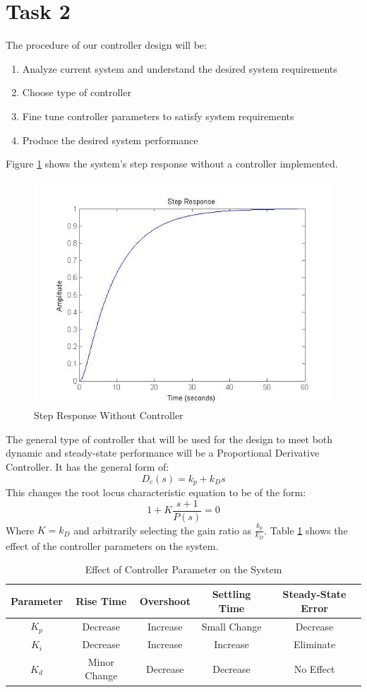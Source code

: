 \documentclass[12pt,letter]{article}
\begin{document}
\section*{Task 2}
The procedure of our controller design will be:
\begin{enumerate}
	\item Analyze current system and understand the desired system requirements
	\item Choose type of controller
	\item Fine tune controller parameters to satisfy system requirements
	\item Produce the desired system performance
\end{enumerate}
Figure \ref{fig:nocontrol} shows the system's step response without a controller implemented.
\begin{figure}[H]
\centering
\includegraphics[width=1\linewidth]{nocontrol}
\caption{Step Response Without Controller}
\label{fig:nocontrol}
\end{figure}
\noindent The general type of controller that will be used for the design to meet both dynamic and steady-state performance will be a Proportional Derivative Controller. It has the general form of:
$$D_{c}(s)=k_{p}+k_{D}s$$
This changes the root locus characteristic equation to be of the form:
$$1+K\frac{s+1}{P(s)}=0$$
Where $K=k_{D}$ and arbitrarily selecting the gain ratio as $\frac{k_{p}}{k_{D}}$. Table \ref{tab:param} shows the effect of the controller parameters on the system.
\begin{table}[H]
	\begin{tabular}{|c|c|c|c|c|}
		\hline
		\textbf{Parameter} & \textbf{Rise Time} & \textbf{Overshoot} & \textbf{Settling Time} & \textbf{Steady-State Error} \\ \hline
		$K_p$ & Decrease & Increase & Small Change & Decrease \\ \hline
		$K_i$ & Decrease & Increase & Increase & Eliminate \\ \hline
		$K_d$ & Minor Change & Decrease & Decrease & No Effect \\ \hline
		
	\end{tabular}
	\caption{Effect of Controller Parameter on the System}
	\label{tab:param}
\end{table}
\end{document}
